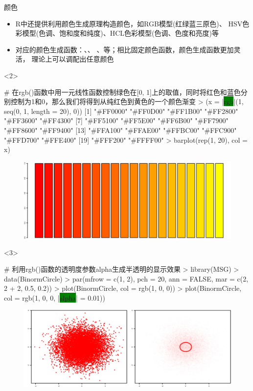 \documentclass{beamerthemeMono}
\begin{document}
\begin{frame}[t,fragile]{\subsecname}{颜色}
\begin{itemize}
\item R中还提供利用颜色生成原理构造颜色，如RGB模型(红绿蓝三原色)、
          HSV色彩模型(色调、饱和度和纯度)、HCL色彩模型(色调、色度和亮度)等
\item 对应的颜色生成函数：、、
      、等；相比固定颜色函数，颜色生成函数更加灵活，
理论上可以调配出任意颜色
\end{itemize}

\begin{overlayarea}{\textwidth}{\textheight}
\begin{onlyenv}<2>
\begin{rcode}
# 在rgb()函数中用一元线性函数控制绿色在[0, 1]上的取值，同时将红色和蓝色分别控制为1和0，那么我们将得到从纯红色到黄色的一个颜色渐变
> (x = |\colorbox{green}{rgb}|(1, seq(0, 1, length = 20), 0))
 [1] "#FF0000" "#FF0D00" "#FF1B00" "#FF2800" "#FF3600" "#FF4300" 
 [7] "#FF5100" "#FF5E00" "#FF6B00" "#FF7900" "#FF8600" "#FF9400" 
[13] "#FFA100" "#FFAE00" "#FFBC00" "#FFC900" "#FFD700" "#FFE400" 
[19] "#FFF200" "#FFFF00"
> barplot(rep(1, 20), col = x)
\end{rcode}
\begin{figure}\centering
  \includegraphics[width=0.8\columnwidth]{rgb-bar.png}
\end{figure}
\end{onlyenv}

\begin{onlyenv}<3>
\begin{rcode}
# 利用rgb()函数的透明度参数alpha生成半透明的显示效果
> library(MSG)
> data(BinormCircle)
> par(mfrow = c(1, 2), pch = 20, ann = FALSE, mar = c(2, 2 + 2, 0.5, 0.2))
> plot(BinormCircle, col = rgb(1, 0, 0))
> plot(BinormCircle, col = rgb(1, 0, 0, |\colorbox{green}{alpha}| = 0.01))
\end{rcode}
\begin{figure}\centering
  \includegraphics[width=0.9\columnwidth]{color-example.png}
\end{figure}
\end{onlyenv}
\end{overlayarea}  
\end{frame}
\end{document}
